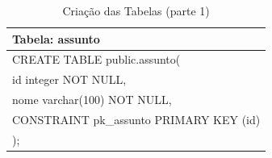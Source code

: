 \documentclass[graduacao,brazil]{ThesisPUC}
\begin{document}
\begin{table}[H]
{\begin{tabular}{|l|}
    Tabela: assunto                                                                                                                                                                                                                                                                    \\ \hline
    CREATE TABLE public.assunto( \\	id integer NOT NULL, \\	nome varchar(100) NOT NULL, \\	CONSTRAINT pk\_assunto PRIMARY KEY (id) \\);                                                                                                                                                \\ \hline
    \end{tabular}
    }
    \caption {Cria\c{c}\~{a}o das Tabelas (parte 1)}
\end{table}

\end{document}
